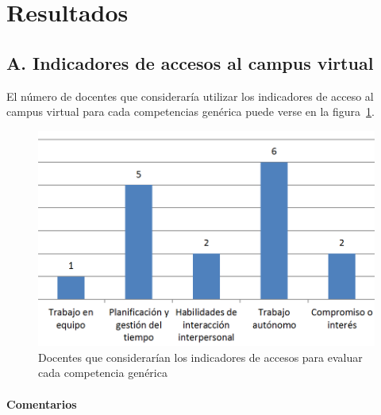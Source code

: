 \section{Resultados} \label{ape:AA:resultados}

	\subsection*{A. Indicadores de accesos al campus virtual}

El número de docentes que consideraría utilizar los indicadores de acceso al campus virtual para cada competencias genérica puede verse en la figura~\ref{fig:ape:aa:accesos}.

\begin{figure}[ht]
    \includegraphics[scale=0.45]{aa_accesos.png}
  \caption{Docentes que considerarían los indicadores de accesos para evaluar cada competencia genérica}
  \label{fig:ape:aa:accesos}
\end{figure}

\paragraph*{Comentarios}

